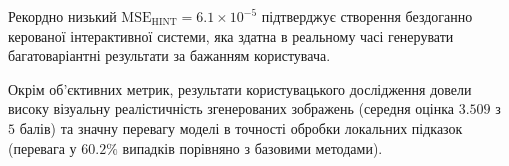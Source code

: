     Рекордно низький $\mathrm{MSE}_{\mathrm{HINT}} = 6.1 \times 10^{-5}$ підтверджує створення бездоганно керованої інтерактивної системи,
    яка здатна в реальному часі генерувати багатоваріантні результати за бажанням користувача.

    Окрім об'єктивних метрик, результати користувацького дослідження довели високу візуальну реалістичність згенерованих зображень (середня оцінка $3.509$ з $5$ балів)
    та значну перевагу моделі в точності обробки локальних підказок (перевага у $60.2\%$ випадків порівняно з базовими методами).







